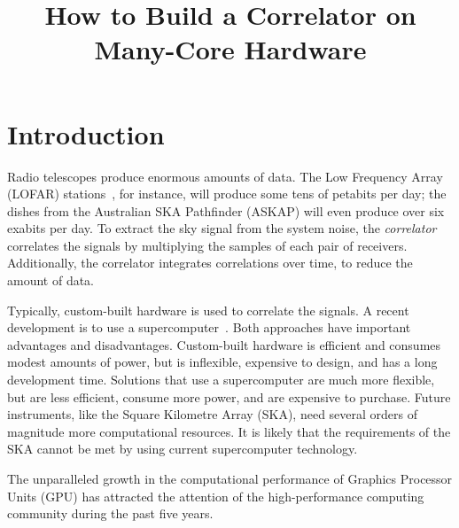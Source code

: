 \documentclass{article}
\title{How to Build a Correlator on Many-Core Hardware}
\begin{document}
\maketitle

\begin{abstract}
\end{abstract}

\section{Introduction}

Radio telescopes produce enormous amounts of data.
The Low Frequency Array (LOFAR) stations~\cite{Butcher:04,deVos:09}, for
instance, will produce some tens of petabits per day; the dishes from the
Australian SKA Pathfinder (ASKAP) will even produce over six exabits per day.
To extract the sky signal from the system noise, the \emph{correlator\/}
correlates the signals by multiplying the samples of each pair of receivers.
Additionally, the correlator integrates correlations over time, to reduce
the amount of data.

Typically, custom-built hardware is used to correlate the signals.
A recent development is to use a supercomputer~\cite{Romein:06,Romein:09b}.
Both approaches have important advantages and disadvantages.
Custom-built hardware is efficient and consumes modest amounts of power, but is
inflexible, expensive to design, and has a long development time.
Solutions that use a supercomputer are much more flexible, but are less
efficient, consume more power, and are expensive to purchase.
Future instruments, like the Square Kilometre Array (SKA), need several orders
of magnitude more computational resources.
It is likely that the requirements of the SKA cannot be met by using
current supercomputer technology.

The unparalleled growth in the computational performance of Graphics Processor
Units (GPU) has attracted the attention of the high-performance computing 
community during the past five years.







\end{document}

